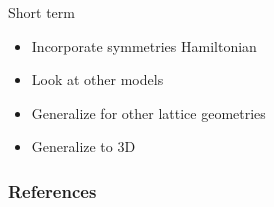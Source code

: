 \documentclass[aspectratio=169]{beamer}
\begin{document}
\begin{frame}{Short term}
    \begin{itemize}
        \item Incorporate symmetries Hamiltonian
        \item Look at other models
        \item Generalize for other lattice geometries
        \item Generalize to 3D
    \end{itemize}
\end{frame}

\begin{frame}[allowframebreaks]
    \frametitle{References}
    
    
\end{frame}
\end{document}
